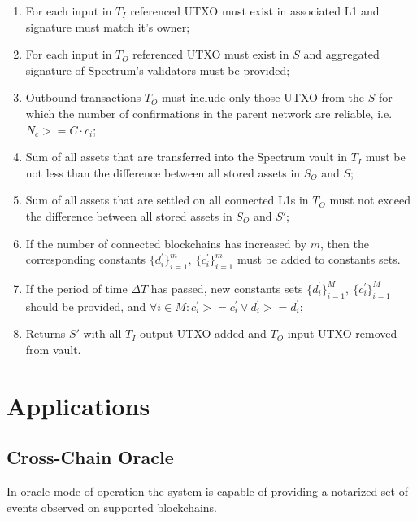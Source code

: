 \documentclass{article}
\begin{document}
    \begin{enumerate}

        \item For each input in $T_I$ referenced UTXO must exist in associated L1 and signature must match it's owner;

        \item For each input in $T_O$ referenced UTXO must exist in $S$ and aggregated signature of Spectrum's validators must be provided;

        \item Outbound transactions $T_O$ must include only those UTXO from the $S$ for which the number of confirmations in the parent network are reliable, i.e. $N_c>=C\cdot c_i$;

        \item Sum of all assets that are transferred into the Spectrum vault in $T_I$ must be not less than the difference between all stored assets in $S_O$ and $S$;

        \item Sum of all assets that are settled on all connected L1s in $T_O$ must not exceed the difference between all stored assets in $S_O$ and $S'$;

        \item If the number of connected blockchains has increased by $m$, then the corresponding constants $\{d_{i}^{'}\}_{i=1}^{m},\ \{c_{i}^{'}\}_{i=1}^{m}$ must be added to constants sets.

        \item If the period of time $\Delta T$ has passed, new constants sets $\{d_{i}^{'}\}_{i=1}^{M},\ \{c_{i}^{'}\}_{i=1}^{M}$ should be provided, and $\forall i \in M: {c^{'}_i >= c^{'}_i \vee d^{'}_i >= d^{'}_i}$;

        \item Returns $S'$ with all $T_I$ output UTXO added and $T_O$ input UTXO removed from vault.

    \end{enumerate}


    \section{Applications}\label{sec:applications}

    \subsection{Cross-Chain Oracle}\label{subsec:cross-chain-oracle}
    In oracle mode of operation the system is capable of providing a notarized set of events observed on supported blockchains.
\end{document}
